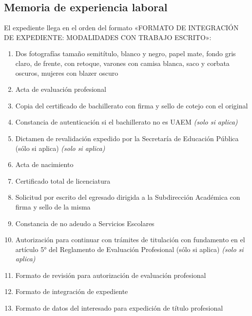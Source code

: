 \subsection{Memoria de experiencia laboral}
El expediente llega en el orden del formato «FORMATO DE INTEGRACIÓN DE EXPEDIENTE: MODALIDADES CON TRABAJO ESCRITO»:
\begin{enumerate}
  \item Dos fotografías tamaño semitítulo, blanco y negro, papel mate, fondo gris claro, de frente, con retoque, varones con camisa blanca, saco y corbata oscuros, mujeres con blazer oscuro
  \item Acta de evaluación profesional
  \item Copia del certificado de bachillerato con firma y sello de cotejo con el original
  \item Constancia de autenticación si el bachillerato no es UAEM \emph{(solo si aplica)}
  \item Dictamen de revalidación expedido por la Secretaría de Educación Pública (sólo si aplica) \emph{(solo si aplica)}
  \item Acta de nacimiento
  \item Certificado total de licenciatura
  \item Solicitud por escrito del egresado dirigida a la Subdirección Académica con firma y sello de la misma
  \item Constancia de no adeudo a Servicios Escolares
  \item Autorización para continuar con trámites de titulación con fundamento en el artículo 5° del Reglamento de Evaluación Profesional (sólo si aplica) \emph{(solo si aplica)}
  \item Formato de revisión para autorización de evaluación profesional
  \item Formato de integración de expediente
  \item Formato de datos del interesado para expedición de título profesional
\end{enumerate}
